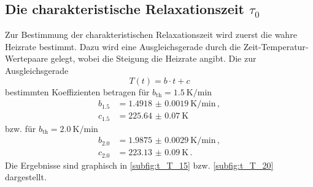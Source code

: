 \subsection{Die charakteristische Relaxationszeit \texorpdfstring{$\tau_0$}{tau0}}
Zur Bestimmung der charakteristischen Relaxationszeit wird zuerst die wahre Heizrate bestimmt.
Dazu wird eine Ausgleichsgerade durch die Zeit-Temperatur-Wertepaare gelegt, wobei die Steigung die Heizrate angibt.
Die zur Ausgleichsgerade
\begin{equation*}
    T(t) = b \cdot t + c
\end{equation*}
bestimmten Koeffizienten betragen für $b_\text{th} = \SI{1.5}{\kelvin \per \minute}$
\begin{align*}
    b_{1.5} &= \SI{1.4918(19)}{\kelvin \per \minute} \, , \\
    c_{1.5} &= \SI{225.64(7)}{\kelvin} 
\end{align*}
bzw. für $b_\text{th} = \SI{2.0}{\kelvin \per \minute}$
\begin{align}
    b_{2.0} &= \SI{1.9875(29)}{\kelvin \per \minute} \, , \\
    c_{2.0} &= \SI{223.13(9)}{\kelvin} \, .
\end{align}
Die Ergebnisse sind graphisch in \autoref{subfig:t_T_15} bzw. \autoref{subfig:t_T_20} dargestellt.
